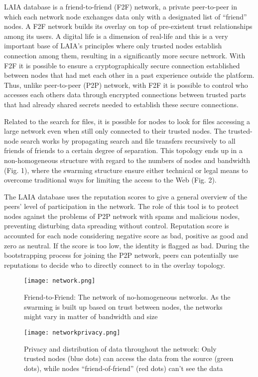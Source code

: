 \documentclass[conference,final,]{IEEEtran}
\makeatletter
\def\maxwidth{\ifdim\Gin@nat@width>\linewidth\linewidth
\else\Gin@nat@width\fi}
\let\Oldincludegraphics\includegraphics
\renewcommand{\includegraphics}[1]{\Oldincludegraphics[width=\maxwidth]{#1}}
\makeatother
\begin{document}
LAIA database is a friend-to-friend (F2F) network, a private
peer-to-peer in which each network node exchanges data only with a
designated list of ``friend'' nodes. A F2F network builds its overlay on
top of pre-existent trust relationships among its users. A digital life
is a dimension of real-life and this is a very important base of LAIA's
principles where only trusted nodes establish connection among them,
resulting in a significantly more secure network. With F2F it is
possible to ensure a cryptographically secure connection established
between nodes that had met each other in a past experience outside the
platform. Thus, unlike peer-to-peer (P2P) network, with F2F it is
possible to control who accesses each others data through encrypted
connections between trusted parts that had already shared secrets needed
to establish these secure connections.

Related to the search for files, it is possible for nodes to look for
files accessing a large network even when still only connected to their
trusted nodes. The trusted-node search works by propagating search and
file transfers recursively to all friends of friends to a certain degree
of separation. This topology ends up in a non-homogeneous structure with
regard to the numbers of nodes and bandwidth (Fig. 1), where the
swarming structure ensure either technical or legal means to overcome
traditional ways for limiting the access to the Web (Fig. 2).

The LAIA database uses the reputation scores to give a general overview
of the peers' level of participation in the network. The role of this
tool is to protect nodes against the problems of P2P network with spams
and malicious nodes, preventing disturbing data spreading without
control. Reputation score is accounted for each node considering
negative score as bad, positive as good and zero as neutral. If the
score is too low, the identity is flagged as bad. During the
bootstrapping process for joining the P2P network, peers can potentially
use reputations to decide who to directly connect to in the overlay
topology.

\begin{figure}
\centering
\texttt{[image: network.png]}
\caption{Friend-to-Friend: The network of no-homogeneous networks. As
the swarming is built up based on trust between nodes, the networks
might vary in matter of bandwidth and size}
\end{figure}

\begin{figure}
\centering
\texttt{[image: networkprivacy.png]}
\caption{Privacy and distribution of data throughout the network: Only
trusted nodes (blue dots) can access the data from the source (green
dots), while nodes ``friend-of-friend'' (red dots) can't see the data}
\end{figure}
\end{document}
